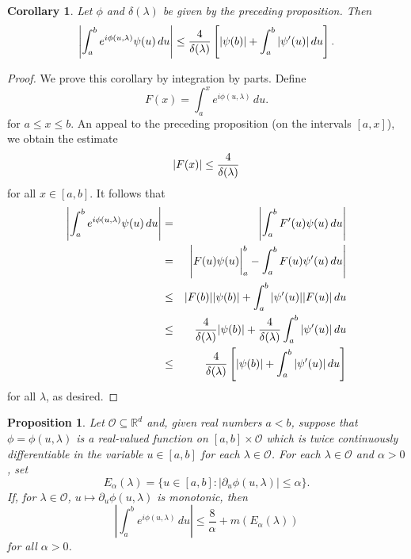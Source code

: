 \documentclass[11pt, letter]{book}
\newtheorem{corollary}[theorem]{Corollary}
\newtheorem{proposition}[theorem]{Proposition}
\newcommand{\lb}{\left[}
\newcommand{\rb}{\right]}
\newcommand{\f}[2]{\frac{#1}{#2}}
\begin{document}
\begin{framed}
\begin{corollary}\label{cor:DeltaLambda}
Let $\phi$ and $\delta(\lambda)$ be given by the preceding proposition. Then
\begin{equation*}
    \left|\int_a^b e^{i\phi(u,\lambda)} \psi(u)\,du \right| \leq \f{4}{\delta(\lambda)}\lb \abs{\psi(b)} + \int_a^b \abs{\psi'(u)}\,du \rb.
\end{equation*}
\end{corollary}
\end{framed}
\begin{proof}
We prove this corollary by integration by parts. Define
\begin{equation*}
    F(x) = \int_a^x e^{i \phi(u,\lambda)}\,du.
\end{equation*}
for $a\leq x\leq b$. An appeal to the preceding proposition (on the intervals $[a,x]$), we obtain the estimate
\begin{equation*}
    \abs{F(x)} \leq \f{4}{\delta(\lambda)}
\end{equation*}
for all $x\in [a,b]$. It follows that 
\begin{eqnarray*}
     \abs{\int_a^b e^{i \phi(u,\lambda)} \psi(u) \,du} 
     &=& \abs{\int_a^b F'(u)\psi(u)\,du}  \\
     &=& \abs{ F(u)\psi(u)\bigg\vert_{a}^b - \int_a^b F(u)\psi'(u)\,du   } \\
     &\leq& \abs{F(b)}\abs{ \psi(b)} + \int_a^b \abs{\psi'(u)}\abs{ F(u)}\, du  \\
     &\leq& \f{4}{\delta(\lambda)}\abs{\psi(b)} + \f{4}{\delta(\lambda)} \int_a^b \abs{\psi'(u)}\,du\\
     &\leq& \f{4}{\delta(\lambda)}\lb \abs{\psi(b)} + \int_a^b \abs{\psi'(u)}\,du \rb 
\end{eqnarray*}
for all $\lambda$, as desired.
\end{proof}


\begin{framed}
\begin{proposition}\label{prop:EAlpha}
Let $\mathcal{O}\subseteq\mathbb{R}^d$ and, given real numbers $a<b$, suppose that $\phi=\phi(u,\lambda)$ is a real-valued function on $[a,b]\times\mathcal{O}$ which is twice continuously differentiable in the variable $u\in [a,b]$ for each $\lambda\in\mathcal{O}$. For each $\lambda\in\mathcal{O}$ and $\alpha>0$, set
\begin{equation*}
    E_{\alpha}(\lambda)=\{u\in[a,b]:|\partial_u \phi(u,\lambda)|\leq\alpha\}.
\end{equation*}
If, for $\lambda\in\mathcal{O}$, $u\mapsto \partial_u\phi(u,\lambda)$ is monotonic, then
\begin{equation*}
\left|\int_a^b e^{i\phi(u,\lambda)}\,du\right| \leq \frac{8}{\alpha}+m(E_\alpha(\lambda))
\end{equation*}
for all $\alpha>0$.
\end{proposition}
\end{framed}
\end{document}
